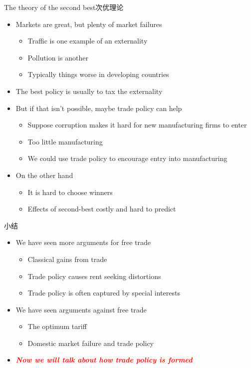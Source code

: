 \documentclass[10pt,hyperref={CJKbookmarks=true},xcolor=dvipsnames,aspectratio=169]{beamer}
\begin{document}
\begin{frame}{The theory of the second best次优理论}
\begin{itemize}
\item Markets are great, but plenty of market failures
\begin{itemize}
\item Traffic is one example of an externality
\item Pollution is another
\item Typically things worse in developing countries
\end{itemize}
\item The best policy is usually to tax the externality
\item But if that isn't possible, maybe trade policy can help
\begin{itemize}
\item Suppose corruption makes it hard for new manufacturing firms to enter
\item Too little manufacturing
\item We could use trade policy to encourage entry into manufacturing
\end{itemize}
\item On the other hand
\begin{itemize}
\item It is hard to choose winners
\item Effects of second-best costly and hard to predict
\end{itemize}
\end{itemize}
\end{frame}

\begin{frame}{小结}
\begin{itemize}
\item We have seen more arguments for free trade
\begin{itemize}
\item Classical gains from trade
\item Trade policy causes rent seeking distortions
\item Trade policy is often captured by special interests
\end{itemize}
\item We have seen arguments against free trade
\begin{itemize}
\item The optimum tariff
\item Domestic market failure and trade policy
\end{itemize}
\item  \textbf{\textcolor{red}{\emph{Now we will talk about how trade policy is formed}}}
\end{itemize}
\end{frame}
\end{document}
